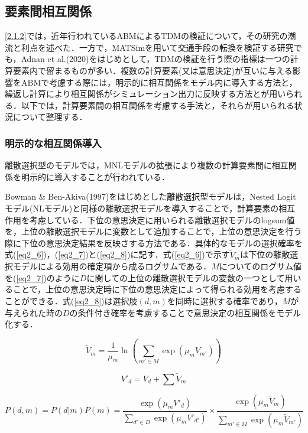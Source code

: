 \subsection{要素間相互関係}\label{2.1.3}

\ref{2.1.2}では，近年行われているABMによるTDMの検証について，その研究の潮流と利点を述べた．一方で，MATSimを用いて交通手段の転換を検証する研究でも，Adnan et al.(2020)をはじめとして，TDMの検証を行う際の指標は一つの計算要素内で留まるものが多い．複数の計算要素(又は意思決定)が互いに与える影響をABMで考慮する際には，明示的に相互関係をモデル内に導入する方法と，繰返し計算により相互関係がシミュレーション出力に反映する方法とが用いられる．以下では，計算要素間の相互関係を考慮する手法と，それらが用いられる状況について整理する．  

\subsubsection{明示的な相互関係導入}
離散選択型のモデルでは，MNLモデルの拡張により複数の計算要素間に相互関係を明示的に導入することが行われている．

Bowman \& Ben-Akiva(1997)をはじめとした離散選択型モデルは，Nested Logit モデル(NLモデル)と同様の離散選択モデルを導入することで，計算要素の相互作用を考慮している．下位の意思決定に用いられる離散選択モデルのlogsum値を，上位の離散選択モデルに変数として追加することで，上位の意思決定を行う際に下位の意思決定結果を反映さする方法である．具体的なモデルの選択確率を式(\ref{eq2_6})，(\ref{eq2_7})と(\ref{eq2_8})に記す．式(\ref{eq2_6})で示す$\tilde{V}_{m}$は下位の離散選択モデルによる効用の確定項から成るログサムである．$M$についてのログサム値を(\ref{eq2_7})のように$D$に関しての上位の離散選択モデルの変数の一つとして用いることで，上位の意思決定時に下位の意思決定によって得られる効用を考慮することができる．式(\ref{eq2_8})は選択肢$(d,m)$を同時に選択する確率であり，$M$が与えられた時の$D$の条件付き確率を考慮することで意思決定の相互関係をモデル化する．

\begin{equation} \label{eq2_6}
	\tilde{V}_{m} = \frac{1}{\mu_m} \ln \left( \sum_{m' \in M} \exp (\mu_m V_{m'}) \right)
\end{equation}

\begin{equation} \label{eq2_7}
	V'_d = V_d + \sum \tilde{V}_m
\end{equation}

\begin{equation} \label{eq2_8}
	P(d,m) = P(d|m)P(m) = \frac{\exp(\mu_m V'_d)}{\sum_{d' \in D} \exp(\mu_m V'_{d'})} \times \frac{\exp(\mu_m \tilde{V}_{m})}{\sum_{m' \in M} \exp(\mu_m \tilde{V}_{m'})}
\end{equation}

